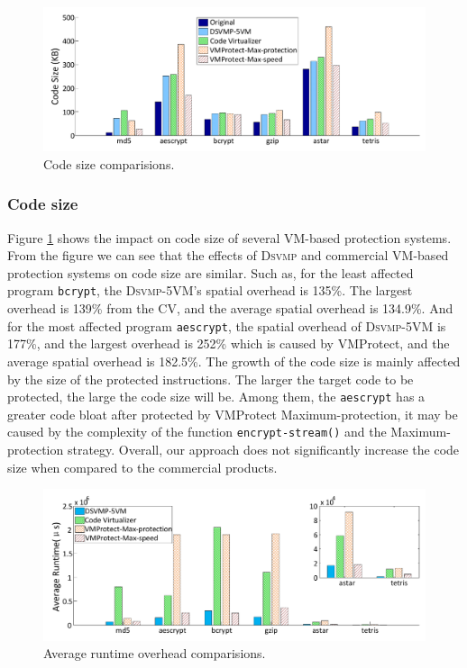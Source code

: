 \documentclass[preprint,12pt,3p]{elsarticle}
\newcommand{\DSVMP}{\textsc{Dsvmp}\xspace}
\begin{document}
\begin{figure}[t]%
    \centering
    \includegraphics[width=0.8\columnwidth]{figure/comsize.pdf}
    \caption{Code size comparisions.}\label{fig:Fig.com-size}
\end{figure}

\subsubsection{Code size}
Figure \ref{fig:Fig.com-size} shows the impact on code size of several VM-based protection systems.
From the figure we can see that the effects of \DSVMP and commercial VM-based protection systems on code size are similar.
Such as, for the least affected program \texttt{bcrypt}, the \DSVMP-5VM's spatial overhead is 135\%.
The largest overhead is 139\% from the CV, and the average spatial overhead is 134.9\%.
And for the most affected program \texttt{aescrypt}, the spatial overhead of \DSVMP-5VM is 177\%,
and the largest overhead is 252\% which is caused by VMProtect, and the average spatial overhead is 182.5\%.
The growth of the code size is mainly affected by the size of the protected instructions.
The larger the target code to be protected, the large the code size will be.
Among them, the \texttt{aescrypt} has a greater code bloat after protected by VMProtect Maximum-protection,
it may be caused by the complexity of the function \texttt{encrypt-stream()} and the Maximum-protection strategy.
Overall, our approach does not significantly increase the code size when compared to the commercial products.

\begin{figure}[t]%
    \centering
    \includegraphics[width=0.8\columnwidth]{figure/comtime.pdf}
    \caption{Average runtime overhead comparisions.}\label{fig:Fig.com-time}
\end{figure}
\end{document}
